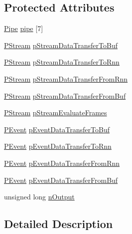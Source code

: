 \subsection*{Protected Attributes}
\begin{DoxyCompactItemize}
\item 
\hyperlink{classfractal_1_1Pipe}{Pipe} \hyperlink{classfractal_1_1Evaluator_af1b7a76f5d14c5447561cbda1ecd37d6}{pipe} \mbox{[}7\mbox{]}
\item 
\hyperlink{classfractal_1_1PStream}{P\+Stream} \hyperlink{classfractal_1_1Evaluator_ab34befc0627eb94e9559282c687eb183}{p\+Stream\+Data\+Transfer\+To\+Buf}
\item 
\hyperlink{classfractal_1_1PStream}{P\+Stream} \hyperlink{classfractal_1_1Evaluator_a4e4c2b409fe2ab8460ebbbb1e41fca90}{p\+Stream\+Data\+Transfer\+To\+Rnn}
\item 
\hyperlink{classfractal_1_1PStream}{P\+Stream} \hyperlink{classfractal_1_1Evaluator_a06f1136f2b87a4fbd5ea81aeb148e45f}{p\+Stream\+Data\+Transfer\+From\+Rnn}
\item 
\hyperlink{classfractal_1_1PStream}{P\+Stream} \hyperlink{classfractal_1_1Evaluator_a58509a00a0d2c1d8088f8c8689b11f5c}{p\+Stream\+Data\+Transfer\+From\+Buf}
\item 
\hyperlink{classfractal_1_1PStream}{P\+Stream} \hyperlink{classfractal_1_1Evaluator_a1b28c337bbd72ffbef3d74a98954bbee}{p\+Stream\+Evaluate\+Frames}
\item 
\hyperlink{classfractal_1_1PEvent}{P\+Event} \hyperlink{classfractal_1_1Evaluator_a8b97c09b92c03045342a14239bf6efdf}{p\+Event\+Data\+Transfer\+To\+Buf}
\item 
\hyperlink{classfractal_1_1PEvent}{P\+Event} \hyperlink{classfractal_1_1Evaluator_a8548966331cd0aa862ec992a720a5e1f}{p\+Event\+Data\+Transfer\+To\+Rnn}
\item 
\hyperlink{classfractal_1_1PEvent}{P\+Event} \hyperlink{classfractal_1_1Evaluator_a58cc420ff3c4d3eb859afc74c9fb3efa}{p\+Event\+Data\+Transfer\+From\+Rnn}
\item 
\hyperlink{classfractal_1_1PEvent}{P\+Event} \hyperlink{classfractal_1_1Evaluator_adc747963637fee84d11bae8101f0545f}{p\+Event\+Data\+Transfer\+From\+Buf}
\item 
unsigned long \hyperlink{classfractal_1_1Evaluator_a2bfee4084662b6816c8c07c818f7482e}{n\+Output}
\end{DoxyCompactItemize}


\subsection{Detailed Description}


